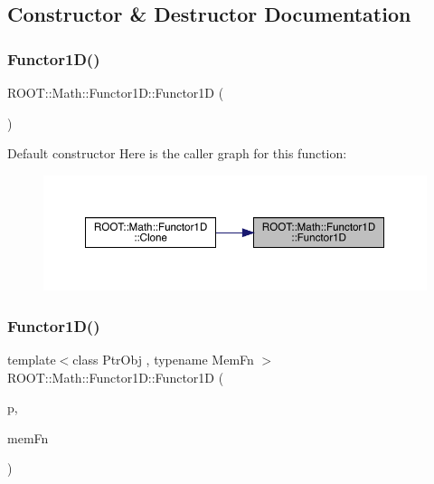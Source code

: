 \subsection{Constructor \& Destructor Documentation}
\mbox{\label{classROOT_1_1Math_1_1Functor1D_ad3e410215d5ac30310dedb841bf6a88f}} 
\subsubsection{\texorpdfstring{Functor1D()}{Functor1D()}\hspace{0.1cm}{\footnotesize\ttfamily [1/8]}}
{\footnotesize\ttfamily R\+O\+O\+T\+::\+Math\+::\+Functor1\+D\+::\+Functor1D (\begin{DoxyParamCaption}{ }\end{DoxyParamCaption})\hspace{0.3cm}{\ttfamily [inline]}}

Default constructor Here is the caller graph for this function\+:\nopagebreak
\begin{figure}[H]
\begin{center}
\leavevmode
\includegraphics[width=350pt]{dc/d6d/classROOT_1_1Math_1_1Functor1D_ad3e410215d5ac30310dedb841bf6a88f_icgraph}
\end{center}
\end{figure}
\mbox{\label{classROOT_1_1Math_1_1Functor1D_a6aee539fa2657228e99a1fc542f9ff9e}} 
\subsubsection{\texorpdfstring{Functor1D()}{Functor1D()}\hspace{0.1cm}{\footnotesize\ttfamily [2/8]}}
{\footnotesize\ttfamily template$<$class Ptr\+Obj , typename Mem\+Fn $>$ \\
R\+O\+O\+T\+::\+Math\+::\+Functor1\+D\+::\+Functor1D (\begin{DoxyParamCaption}\item[{const Ptr\+Obj \&}]{p,  }\item[{Mem\+Fn}]{mem\+Fn }\end{DoxyParamCaption})\hspace{0.3cm}{\ttfamily [inline]}}

